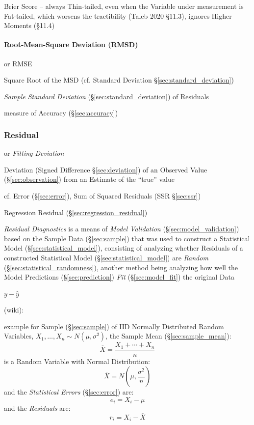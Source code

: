 Brier Score -- always Thin-tailed, even when the Variable under measurement is
Fat-tailed, which worsens the tractibility (Taleb 2020 \S 11.3), ignores Higher
Moments (\S 11.4)



\paragraph{Root-Mean-Square Deviation (RMSD)}\label{sec:rmsd}\hfill

or RMSE

Square Root of the MSD (cf. Standard Deviation \S\ref{sec:standard_deviation})

\emph{Sample Standard Deviation} (\S\ref{sec:standard_deviation}) of Residuals

measure of Accuracy (\S\ref{sec:accuracy})



\subsubsection{Residual}\label{sec:residual}

or \emph{Fitting Deviation}

Deviation (Signed Difference \S\ref{sec:deviation}) of an Observed Value
(\S\ref{sec:observation}) from an Estimate of the ``true'' value

cf. Error (\S\ref{sec:error}), Sum of Squared Residuals (SSR \S\ref{sec:ssr})

\fist Regression Residual (\S\ref{sec:regression_residual})

\emph{Residual Diagnostics} is a means of \emph{Model Validation}
(\S\ref{sec:model_validation}) based on the Sample Data (\S\ref{sec:sample})
that was used to construct a Statistical Model (\S\ref{sec:statistical_model}),
consisting of analyzing whether Residuals of a constructed Statistical Model
(\S\ref{sec:statistical_model}) are \emph{Random}
(\S\ref{sec:statistical_randomness}), another method being analyzing how well
the Model Predictions (\S\ref{sec:prediction}) \emph{Fit}
(\S\ref{sec:model_fit}) the original Data

$y - \hat{y}$

(wiki):

example for Sample (\S\ref{sec:sample}) of IID Normally Distributed Random
Variables, $X_1, \ldots, X_n \sim N(\mu, \sigma^2)$, the Sample Mean
(\S\ref{sec:sample_mean}):
\[
  \overline{X} = \frac{X_1 + \cdots + X_n}{n}
\]
is a Random Variable with Normal Distribution:
\[
  \overline{X} = N(\mu, \frac{\sigma^2}{n})
\]
and the \emph{Statistical Errors} (\S\ref{sec:error}) are:
\[
  e_i = X_i - \mu
\]
and the \emph{Residuals} are:
\[
  r_i = X_i - \overline{X}
\]



